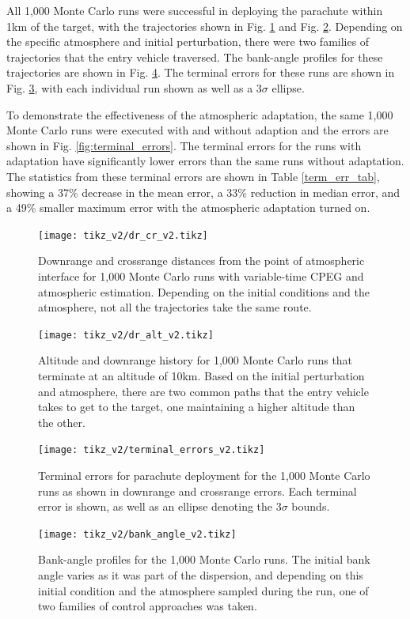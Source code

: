 All 1,000 Monte Carlo runs were successful in deploying the parachute within 1km of the target, with the trajectories shown in Fig. \ref{fig:dr_cr} and Fig. \ref{fig:dr_alt}. Depending on the specific atmosphere and initial perturbation, there were two families of trajectories that the entry vehicle traversed. The bank-angle profiles for these trajectories are shown in Fig. \ref{fig:bank_angle}. The terminal errors for these runs are shown in Fig. \ref{fig:term_err}, with each individual run shown as well as a $3\sigma$ ellipse. 

To demonstrate the effectiveness of the atmospheric adaptation, the same 1,000 Monte Carlo runs were executed with and without adaption and the errors are shown in Fig. \ref{fig:terminal_errors}. The terminal errors for the runs with adaptation have significantly lower errors than the same runs without adaptation. The statistics from these terminal errors are shown in Table \ref{term_err_tab}, showing a 37\% decrease in the mean error, a 33\% reduction in median error, and a 49\% smaller maximum error with the atmospheric adaptation turned on. 
\begin{figure}
    \centering
    \texttt{[image: tikz\_v2/dr\_cr\_v2.tikz]}
    \caption{Downrange and crossrange distances from the point of atmospheric interface for 1,000 Monte Carlo runs with variable-time CPEG and atmospheric estimation. Depending on the initial conditions and the atmosphere, not all the trajectories take the same route.}
    \label{fig:dr_cr}
\end{figure}
\begin{figure}
    \centering
    \texttt{[image: tikz\_v2/dr\_alt\_v2.tikz]}
    \caption{Altitude and downrange history for 1,000 Monte Carlo runs that terminate at an altitude of 10km. Based on the initial perturbation and atmosphere, there are two common paths that the entry vehicle takes to get to the target, one maintaining a higher altitude than the other.}
    \label{fig:dr_alt}
\end{figure}
\begin{figure}
    \centering
    \texttt{[image: tikz\_v2/terminal\_errors\_v2.tikz]}
    \caption{Terminal errors for parachute deployment for the 1,000 Monte Carlo runs as shown in downrange and crossrange errors. Each terminal error is shown, as well as an ellipse denoting the $3\sigma$ bounds.}
    \label{fig:term_err}
\end{figure}
\begin{figure}
    \centering
    \texttt{[image: tikz\_v2/bank\_angle\_v2.tikz]}
    \caption{Bank-angle profiles for the 1,000 Monte Carlo runs. The initial bank angle varies as it was part of the dispersion, and depending on this initial condition and the atmosphere sampled during the run, one of two families of control approaches was taken. }
    \label{fig:bank_angle}
\end{figure}
